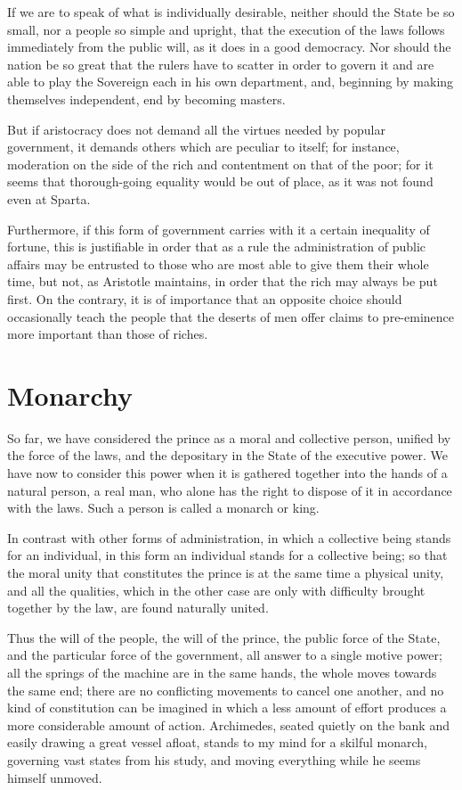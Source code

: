 \documentclass[12pt]{report}
\begin{document}
If we are to speak of what is individually desirable, neither should the State be so small, nor a people so simple and upright, that the execution of the laws follows immediately from the public will, as it does in a good democracy. Nor should the nation be so great that the rulers have to scatter in order to govern it and are able to play the Sovereign each in his own department, and, beginning by making themselves independent, end by becoming masters.

But if aristocracy does not demand all the virtues needed by popular government, it demands others which are peculiar to itself; for instance, moderation on the side of the rich and contentment on that of the poor; for it seems that thorough-going equality would be out of place, as it was not found even at Sparta.

Furthermore, if this form of government carries with it a certain inequality of fortune, this is justifiable in order that as a rule the administration of public affairs may be entrusted to those who are most able to give them their whole time, but not, as Aristotle maintains, in order that the rich may always be put first. On the contrary, it is of importance that an opposite choice should occasionally teach the people that the deserts of men offer claims to pre-eminence more important than those of riches.

\section{Monarchy}
So far, we have considered the prince as a moral and collective person, unified by the force of the laws, and the depositary in the State of the executive power. We have now to consider this power when it is gathered together into the hands of a natural person, a real man, who alone has the right to dispose of it in accordance with the laws. Such a person is called a monarch or king.

In contrast with other forms of administration, in which a collective being stands for an individual, in this form an individual stands for a collective being; so that the moral unity that constitutes the prince is at the same time a physical unity, and all the qualities, which in the other case are only with difficulty brought together by the law, are found naturally united.

Thus the will of the people, the will of the prince, the public force of the State, and the particular force of the government, all answer to a single motive power; all the springs of the machine are in the same hands, the whole moves towards the same end; there are no conflicting movements to cancel one another, and no kind of constitution can be imagined in which a less amount of effort produces a more considerable amount of action. Archimedes, seated quietly on the bank and easily drawing a great vessel afloat, stands to my mind for a skilful monarch, governing vast states from his study, and moving everything while he seems himself unmoved.
\end{document}
